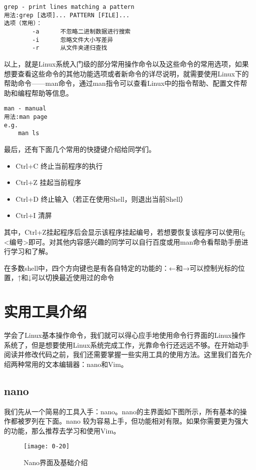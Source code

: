 \begin{verbatim}
grep - print lines matching a pattern
用法:grep [选项]... PATTERN [FILE]...
选项（常用）：
		-a		不忽略二进制数据进行搜索
		-i		忽略文件大小写差异
		-r		从文件夹递归查找
\end{verbatim}

以上，就是Linux系统入门级的部分常用操作命令以及这些命令的常用选项，如果想要查看这些命令的其他功能选项或者新命令的详尽说明，就需要使用Linux下的帮助命令——man命令，通过man指令可以查看Linux中的指令帮助、配置文件帮助和编程帮助等信息。

\begin{verbatim}
man - manual
用法:man page
e.g.
	man ls
\end{verbatim}

最后，还有下面几个常用的快捷键介绍给同学们。
\begin{itemize}
    \item Ctrl+C	终止当前程序的执行
	\item Ctrl+Z	挂起当前程序
	\item Ctrl+D	终止输入（若正在使用Shell，则退出当前Shell）
	\item Ctrl+I	清屏
\end{itemize}

其中，Ctrl+Z挂起程序后会显示该程序挂起编号，若想要恢复该程序可以使用fg <编号>即可。对其他内容感兴趣的同学可以自行百度或用man命令看帮助手册进行学习和了解。

\begin{note}
在多数shell中，四个方向键也是有各自特定的功能的：←和→可以控制光标的位置，↑和↓可以切换最近使用过的命令
\end{note}

\section{实用工具介绍}
学会了Linux基本操作命令，我们就可以得心应手地使用命令行界面的Linux操作系统了，但是想要使用Linux系统完成工作，光靠命令行还远远不够。在开始动手阅读并修改代码之前，我们还需要掌握一些实用工具的使用方法。这里我们首先介绍两种常用的文本编辑器：nano和Vim。
\subsection{nano}
我们先从一个简易的工具入手：nano。nano的主界面如下图所示，所有基本的操作都被罗列在下面。nano 较为容易上手，但功能相对有限。如果你需要更为强大的功能，那么推荐去学习和使用Vim。

\begin{figure}[htbp]
  \centering
  \texttt{[image: 0-20]}
  \caption{Nano界面及基础介绍}\label{fig:0-20}
\end{figure}

